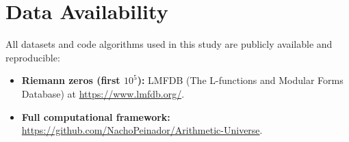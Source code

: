 \documentclass[prl,aps,floatfix,superscriptaddress,10pt]{revtex4-2}
\begin{document}
\section{Data Availability}
All datasets and code algorithms used in this study are publicly available and reproducible:
\begin{itemize}
    \item \textbf{Riemann zeros (first $10^5$):} LMFDB (The L-functions and Modular Forms Database) at \url{https://www.lmfdb.org/}.
    \item \textbf{Full computational framework:} \url{https://github.com/NachoPeinador/Arithmetic-Universe}.
\end{itemize}



\end{document}

